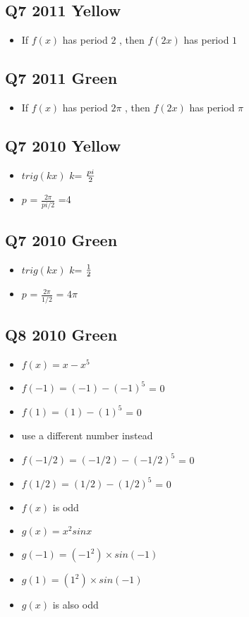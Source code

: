 \documentclass[11pt,a4paper,titlepage,oneside,openany]{article}
\numberwithin{equation}{section}
\numberwithin{algorithm}{section}
\numberwithin{figure}{section}
\numberwithin{table}{section}
\begin{document}
\subsection*{Q7 2011 Yellow}
\begin{itemize}
\item If $f(x)$ has period $2$ , then $f(2x)$ has period $1$
\end{itemize}
\subsection*{Q7 2011 Green}
\begin{itemize}
\item If $f(x)$ has period $2\pi$ , then $f(2x)$ has period $\pi$
\end{itemize}
\subsection*{Q7 2010 Yellow}
\begin{itemize}
\item  $trig(kx)$ $k$= ${pi\over 2}$
\item  $p$ = $\frac{2\pi}{pi / 2}$ =4
\end{itemize}
\subsection*{Q7 2010 Green}
\begin{itemize}
\item  $trig(kx)$ $k$= ${1\over2}$
\item  $p$ = $\frac{2\pi}{1/2}$ = $4\pi$
\end{itemize}
\newpage
\subsection{Q8 2010 Green}
\begin{itemize}
\item $f(x) = x - x^5$
\item $f(-1) = (-1) - (-1)^5$ = 0
\item $f(1) = (1) - (1)^5$ = 0
\item use a different number instead
\item $f(-1/2) = (-1/2) - (-1/2)^5$ = 0
\item $f(1/2) = (1/2) - (1/2)^5$ = 0
\item $f(x)$ is odd

\item $g(x) = x^2 sin x$
\item $g(-1) = (-1^2) \times sin(-1)$
\item $g(1) = (1^2) \times sin(-1)$
\item $g(x)$ is also odd
\end{itemize}
\end{document}
